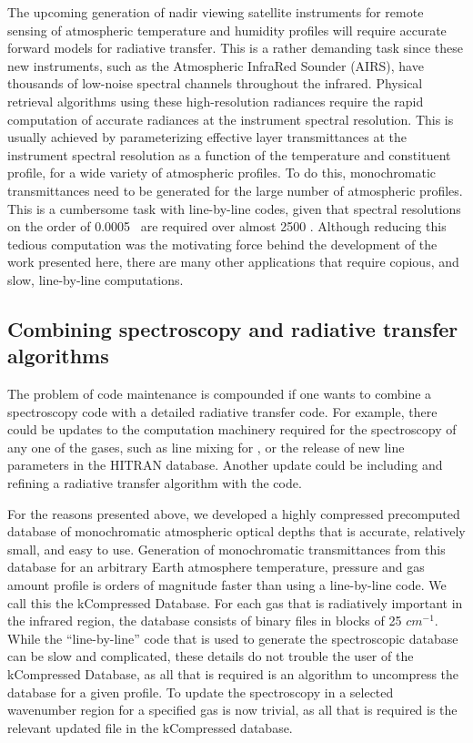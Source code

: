 \documentclass[11pt]{article}
\begin{document}
The upcoming generation of nadir viewing satellite instruments for
remote sensing of atmospheric temperature and humidity profiles will
require accurate forward models for radiative transfer.  This is a
rather demanding task since these new instruments, such as the
Atmospheric InfraRed Sounder (AIRS)\cite{air:91}, have thousands of
low-noise spectral channels throughout the infrared.  Physical
retrieval algorithms using these high-resolution radiances require the
rapid computation of accurate radiances at the instrument spectral
resolution.  This is usually achieved by parameterizing effective
layer transmittances at the instrument spectral resolution as a
function of the temperature and constituent profile, for a wide 
variety of atmospheric profiles. To do this, monochromatic transmittances 
need to be generated for the large number of atmospheric profiles. This 
is a cumbersome task with line-by-line codes, given that spectral 
resolutions on the order of 0.0005 \wn\ are required over almost 2500 \wn.  
Although reducing this
tedious computation was the motivating force behind the development of
the work presented here, there are many other applications that
require copious, and slow, line-by-line computations.

\subsection{Combining spectroscopy and radiative transfer algorithms}
The problem of code maintenance is compounded if one wants to combine a 
spectroscopy code with a detailed radiative transfer code. For example, there
could be updates to the computation machinery required for the spectroscopy of
any one of the gases, such as line mixing for \cd, or the release of new
line parameters in the \textsf{HITRAN} database. Another update could be 
including and refining a radiative transfer algorithm with the code.

For the reasons presented above, we developed a highly compressed precomputed 
database of monochromatic atmospheric optical depths that is accurate, 
relatively small, and easy to use.  Generation of monochromatic transmittances
from this database for an arbitrary Earth atmosphere temperature, pressure 
and gas amount profile is orders of magnitude faster than using a 
line-by-line code. We call this the kCompressed Database. For each gas that
is radiatively important in the infrared region, the database 
consists of binary files in blocks of 25 $cm^{-1}$. While the ``line-by-line''
code that is used to generate the spectroscopic database can be slow and 
complicated, these details do not trouble the user of the kCompressed 
Database, as all that is required is an algorithm to uncompress the database 
for a given profile. To update the spectroscopy in a selected wavenumber 
region for a specified gas is now trivial, as all that is required is the 
relevant updated  file in the kCompressed database. 
\end{document}
